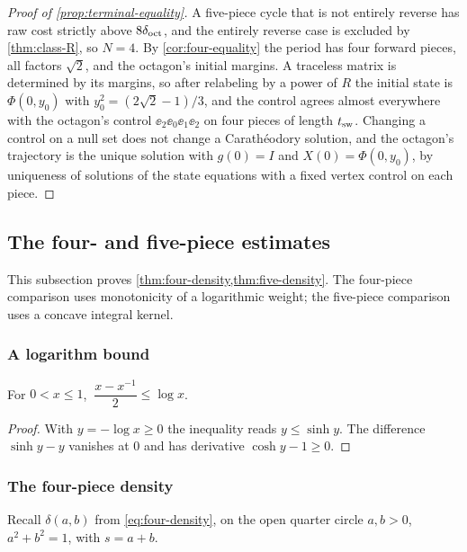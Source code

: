 \begin{proof}[Proof of \cref{prop:terminal-equality}]
A five-piece cycle that is not entirely reverse has raw cost strictly above $8\delta_{\mathrm{oct}}$, and the
entirely reverse case is excluded by \cref{thm:class-R}, so $N=4$. By \cref{cor:four-equality} the period has four forward pieces,
all factors $\sqrt2$, and the octagon's initial margins. A traceless matrix is determined by its
margins, so after relabeling by a power of $R$ the initial state is $\Phi(0,y_0)$ with
$y_0^2=(2\sqrt2-1)/3$, and the control agrees almost everywhere with the octagon's control
$\ee_2\ee_0\ee_1\ee_2$ on four pieces of length $t_{\mathrm{sw}}$. Changing a control on a null set does not
change a Carath\'eodory solution, and the octagon's trajectory is the unique solution with
$g(0)=I$ and $X(0)=\Phi(0,y_0)$, by uniqueness of solutions of the state equations with a fixed
vertex control on each piece.
\end{proof}

\subsection{The four- and five-piece estimates}\label{app:terminal-estimates}

This subsection proves \cref{thm:four-density,thm:five-density}. The four-piece comparison uses
monotonicity of a logarithmic weight; the five-piece comparison uses a concave integral kernel.

\subsubsection{A logarithm bound}\label{app:log-bound}

\begin{lemma}\label{lem:log-sinh}
For $0<x\le1$, $\ \dfrac{x-x^{-1}}{2}\le\log x$.
\end{lemma}

\begin{proof}
With $y=-\log x\ge0$ the inequality reads $y\le\sinh y$. The difference $\sinh y-y$ vanishes
at $0$ and has derivative $\cosh y-1\ge0$.
\end{proof}

\subsubsection{The four-piece density}\label{app:four-density}

Recall $\delta(a,b)$ from \eqref{eq:four-density}, on the open quarter circle $a,b>0$,
$a^2+b^2=1$, with $s=a+b$.

